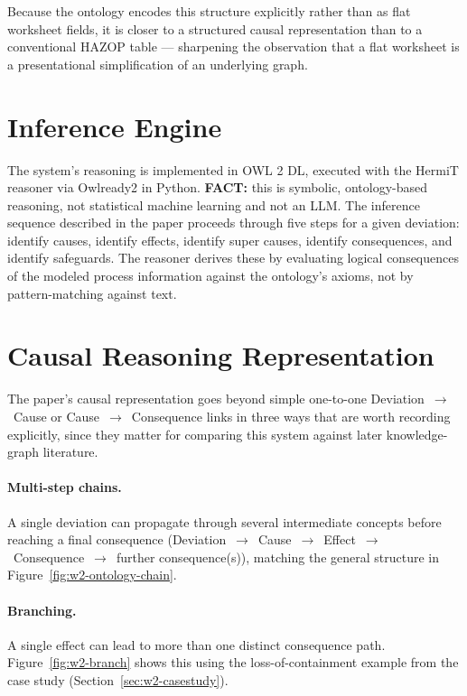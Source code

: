 Because the ontology encodes this structure explicitly rather than as flat worksheet fields, it is closer to a structured causal representation than to a conventional HAZOP table --- sharpening the observation that a flat worksheet is a presentational simplification of an underlying graph.

\section{Inference Engine}
The system's reasoning is implemented in OWL 2 DL, executed with the HermiT reasoner via Owlready2 in Python. \textbf{FACT:} this is symbolic, ontology-based reasoning, not statistical machine learning and not an LLM. The inference sequence described in the paper proceeds through five steps for a given deviation: identify causes, identify effects, identify super causes, identify consequences, and identify safeguards. The reasoner derives these by evaluating logical consequences of the modeled process information against the ontology's axioms, not by pattern-matching against text.

\section{Causal Reasoning Representation}
The paper's causal representation goes beyond simple one-to-one Deviation~$\rightarrow$~Cause or Cause~$\rightarrow$~Consequence links in three ways that are worth recording explicitly, since they matter for comparing this system against later knowledge-graph literature.

\paragraph{Multi-step chains.} A single deviation can propagate through several intermediate concepts before reaching a final consequence (Deviation~$\rightarrow$~Cause~$\rightarrow$~Effect~$\rightarrow$~Consequence~$\rightarrow$~further consequence(s)), matching the general structure in Figure~\ref{fig:w2-ontology-chain}.

\paragraph{Branching.} A single effect can lead to more than one distinct consequence path. Figure~\ref{fig:w2-branch} shows this using the loss-of-containment example from the case study (Section~\ref{sec:w2-casestudy}).

